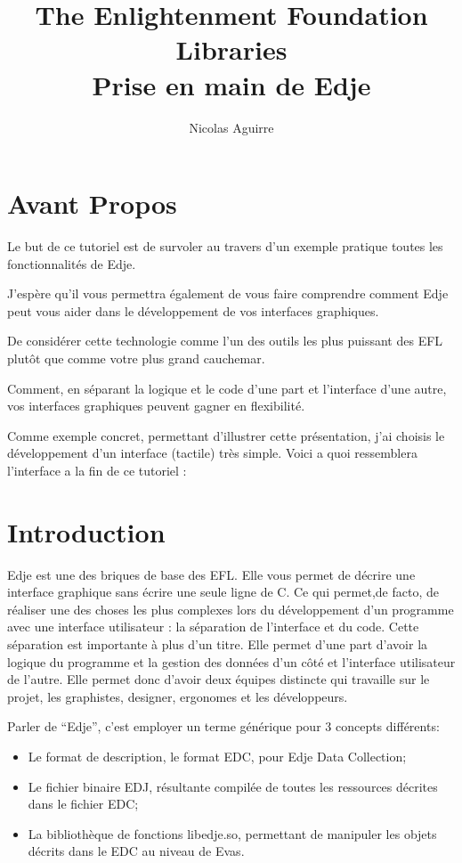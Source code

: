 \documentclass[a4paper]{efr}
\title{The Enlightenment Foundation Libraries\\
  \normalsize{Prise en main de Edje}}
\author{Nicolas Aguirre}
\begin{document}
\maketitle
\tableofcontents

\section{Avant Propos}

Le but de ce tutoriel est de survoler au travers d'un exemple pratique toutes
les fonctionnalités de Edje.

J'espère qu'il vous permettra également de vous faire comprendre comment Edje
peut vous aider dans le développement de vos interfaces graphiques.

De considérer cette technologie comme l'un des outils les plus puissant des
EFL plutôt que comme votre plus grand cauchemar.

Comment, en séparant la logique et le code d'une part et l'interface d'une
autre, vos interfaces graphiques peuvent gagner en flexibilité.

Comme exemple concret, permettant d'illustrer cette présentation, j'ai choisis
le développement d'un interface (tactile) très simple.
Voici a quoi ressemblera l'interface a la fin de ce tutoriel :

\section{Introduction}

Edje est une des briques de base des EFL. Elle vous permet de décrire une
interface graphique sans écrire une seule ligne de C. Ce qui permet,de facto,
de réaliser une des choses les plus complexes lors du développement d'un
programme avec une interface utilisateur : la séparation de l'interface et du
code. Cette séparation est importante à plus d'un titre. Elle permet d'une part
d'avoir la logique du programme et la gestion des données d'un côté et
l'interface utilisateur de l'autre. Elle permet donc d'avoir deux équipes
distincte qui travaille sur le projet, les graphistes, designer, ergonomes et
les développeurs.

Parler de ``Edje'', c'est employer un terme générique pour 3 concepts
différents:
\begin{itemize}
\item Le format de description, le format EDC, pour Edje Data Collection;
\item Le fichier binaire EDJ, résultante compilée de toutes les ressources
décrites dans le fichier EDC;
\item La bibliothèque de fonctions libedje.so, permettant de manipuler les
objets décrits dans le EDC au niveau de Evas.
\end{itemize}
\end{document}
